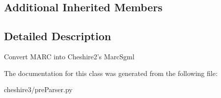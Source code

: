 \subsection*{Additional Inherited Members}


\subsection{Detailed Description}
\begin{DoxyVerb}Convert MARC into Cheshire2's MarcSgml \end{DoxyVerb}
 

The documentation for this class was generated from the following file\-:\begin{DoxyCompactItemize}
\item 
cheshire3/pre\-Parser.\-py\end{DoxyCompactItemize}

